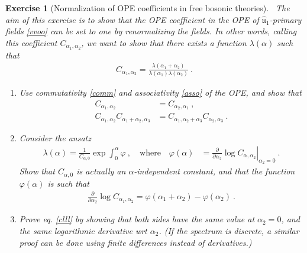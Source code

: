 \documentclass[12pt, a4paper, notitlepage, twoside]{report}
\numberwithin{equation}{section}
\theoremstyle{break}
\newtheorem{exo}{Exercise}[chapter]
\begin{document}
\begin{exo}[Normalization of OPE coefficients in free bosonic theories]
 ~\label{exoone}
The aim of this exercise is to show that the OPE coefficient in the OPE of $\hat{\mathfrak{u}}_1$-primary fields \eqref{vvoo} can be set to one by renormalizing the fields.
In other words, calling this coefficient $C_{\alpha_1,\alpha_2}$, we want to show that there exists a function $\lambda(\alpha)$ such that 
\begin{align}
 C_{\alpha_1,\alpha_2} = \frac{\lambda(\alpha_1+\alpha_2)}{\lambda(\alpha_1)\lambda(\alpha_2)}\ .
\label{clll}
\end{align}

\begin{enumerate}
 \item Use commutativity \eqref{comm} and associativity \eqref{asso} of the OPE, and show that 
\begin{align}
C_{\alpha_1,\alpha_2} &= C_{\alpha_2,\alpha_1}\ ,
\\
 C_{\alpha_1,\alpha_2}C_{\alpha_1+\alpha_2,\alpha_3} &= C_{\alpha_1,\alpha_2+\alpha_3}C_{\alpha_2,\alpha_3}\ .
\end{align}

\item Consider the ansatz
\begin{align}
  \lambda(\alpha) = \frac{1}{C_{\alpha,0}} \exp \int_0^{\alpha} \varphi \ , \quad \text{where}\quad  
 \varphi(\alpha)&=\left.{\frac{\partial}{\partial \alpha_2}}\log C_{\alpha,\alpha_2}\right|_{\alpha_2=0}\ .
\end{align}
Show that $C_{\alpha,0}$ is actually an $\alpha$-independent constant, and that the function $\varphi(\alpha)$ is such that
\begin{align}
 {\frac{\partial}{\partial \alpha_2}} \log C_{\alpha_1,\alpha_2}  = \varphi(\alpha_1+\alpha_2)-\varphi(\alpha_2)\ . 
\end{align}

\item
Prove eq. \eqref{clll} by showing that both sides have the same value at $\alpha_2=0$, and the same logarithmic derivative wrt $\alpha_2$. 
(If the spectrum is discrete, a similar proof can be done using finite differences instead of derivatives.) 
\end{enumerate}
\end{exo}
\end{document}
